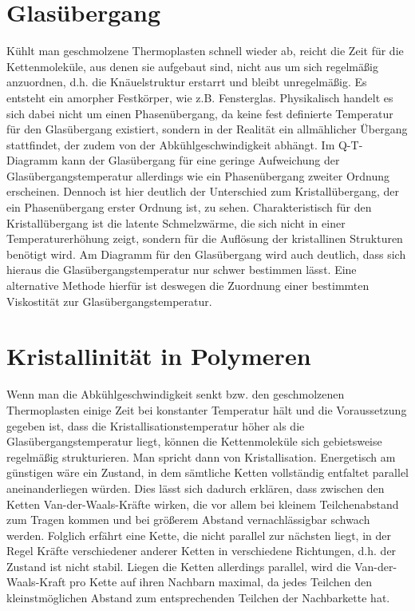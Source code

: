 \documentclass[bigchapter,colorback,accentcolor=tud4b,linedtoc,11pt]{tudreport}
\begin{document}
\section{Glasübergang}

Kühlt man geschmolzene Thermoplasten schnell wieder ab, reicht die Zeit für die Kettenmoleküle, aus denen sie aufgebaut sind, nicht aus um sich regelmäßig anzuordnen, d.h. die Knäuelstruktur erstarrt und bleibt unregelmäßig. Es entsteht ein amorpher Festkörper, wie z.B. Fensterglas. Physikalisch handelt es sich dabei nicht um einen Phasenübergang, da keine fest definierte Temperatur für den Glasübergang existiert, sondern in der Realität ein allmählicher Übergang stattfindet, der zudem von der Abkühlgeschwindigkeit abhängt. Im Q-T-Diagramm kann der Glasübergang für eine geringe Aufweichung der Glasübergangstemperatur allerdings wie ein Phasenübergang zweiter Ordnung erscheinen. Dennoch ist hier deutlich der Unterschied zum Kristallübergang, der ein Phasenübergang erster Ordnung ist, zu sehen. Charakteristisch für den Kristallübergang ist die latente Schmelzwärme, die sich nicht in einer Temperaturerhöhung zeigt, sondern für die Auflösung der kristallinen Strukturen benötigt wird. Am Diagramm für den Glasübergang wird auch deutlich, dass sich hieraus die Glasübergangstemperatur nur schwer bestimmen lässt. Eine alternative Methode hierfür ist deswegen die Zuordnung einer bestimmten Viskostität zur Glasübergangstemperatur.

\section{Kristallinität in Polymeren}

Wenn man die Abkühlgeschwindigkeit senkt bzw. den geschmolzenen Thermoplasten einige Zeit bei konstanter Temperatur hält und die Voraussetzung gegeben ist, dass die Kristallisationstemperatur höher als die Glasübergangstemperatur liegt, können die Kettenmoleküle sich gebietsweise regelmäßig strukturieren. Man spricht dann von Kristallisation. Energetisch am günstigen wäre ein Zustand, in dem sämtliche Ketten vollständig entfaltet parallel aneinanderliegen würden. Dies lässt sich dadurch erklären, dass zwischen den Ketten Van-der-Waals-Kräfte wirken, die vor allem bei kleinem Teilchenabstand zum Tragen kommen und bei größerem Abstand vernachlässigbar schwach werden. Folglich erfährt eine Kette, die nicht parallel zur nächsten liegt, in der Regel Kräfte verschiedener anderer Ketten in verschiedene Richtungen, d.h. der Zustand ist nicht stabil. Liegen die Ketten allerdings parallel, wird die Van-der-Waals-Kraft pro Kette auf ihren Nachbarn maximal, da jedes Teilchen den kleinstmöglichen Abstand zum entsprechenden Teilchen der Nachbarkette hat.
\end{document}
